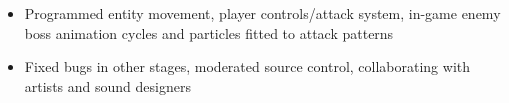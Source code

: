 \documentclass[10pt,a4paper,ragged2e,withhyper]{altacv}
\begin{document}
\begin{paracol}{2}
\begin{itemize}
\item Programmed entity movement, player controls/attack system, in-game enemy boss animation cycles and particles fitted to attack patterns

\item Fixed bugs in other stages, moderated source control, collaborating with artists and sound designers

\end{itemize}



\newpage








\switchcolumn






\end{paracol}
\end{document}
